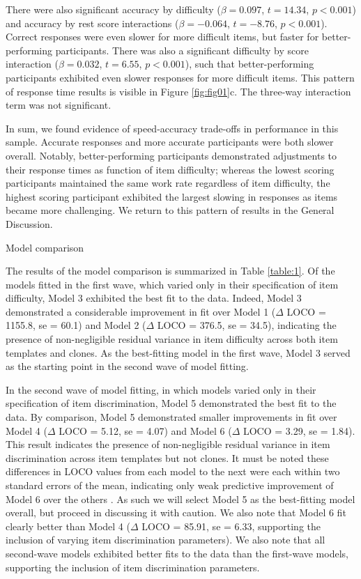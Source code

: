 \documentclass[a4paper,man,natbib]{apa6}
\makeatletter
\renewcommand{\subsubsection}{\@startsection{subsubsection}{3}
  {\z@}%
  {\b@level@two@skip}{\e@level@two@skip}%
  {\normalfont\normalsize\bfseries}}
\makeatother
\begin{document}
There were also significant accuracy by difficulty ($\beta = 0.097$, $t = 14.34$, $p < 0.001$) and accuracy by rest score interactions ($\beta = -0.064$, $t = -8.76$, $p < 0.001$). Correct responses were even slower for more difficult items, but faster for better-performing participants. There was also a significant difficulty by score interaction ($\beta = 0.032$, $t = 6.55$, $p < 0.001$), such that better-performing participants exhibited even slower responses for more difficult items. This pattern of response time results is visible in Figure \ref{fig:fig01}c. The three-way interaction term was not significant. 

In sum, we found evidence of speed-accuracy trade-offs in performance in this sample. Accurate responses and more accurate participants were both slower overall. Notably, better-performing participants demonstrated adjustments to their response times as function of item difficulty; whereas the lowest scoring participants maintained the same work rate regardless of item difficulty, the highest scoring participant exhibited the largest slowing in responses as items became more challenging. We return to this pattern of results in the General Discussion. 

\subsubsection{Model comparison}

The results of the model comparison is summarized in Table \ref{table:1}. Of the models fitted in the first wave, which varied only in their specification of item difficulty, Model 3 exhibited the best fit to the data. Indeed, Model 3 demonstrated a considerable improvement in fit over Model 1 ($\Delta$ LOCO = 1155.8, se = 60.1) and Model 2 ($\Delta$ LOCO = 376.5, se = 34.5), indicating the presence of non-negligible residual variance in item difficulty across both item templates and clones. As the best-fitting model in the first wave, Model 3 served as the starting point in the second wave of model fitting.

In the second wave of model fitting, in which models varied only in their specification of item discrimination, Model 5 demonstrated the best fit to the data. By comparison, Model 5 demonstrated smaller improvements in fit over Model 4 ($\Delta$ LOCO = 5.12, se = 4.07) and Model 6 ($\Delta$ LOCO = 3.29, se = 1.84). This result indicates the presence of non-negligible residual variance in item discrimination across item templates but not clones. It must be noted these differences in LOCO values from each model to the next were each within two standard errors of the mean, indicating only weak predictive improvement of Model 6 over the others \citep{vehtari2022cv}. As such we will select Model 5 as the best-fitting model overall, but proceed in discussing it with caution. We also note that Model 6 fit clearly better than Model 4 ($\Delta$ LOCO = 85.91, se = 6.33, supporting the inclusion of varying item discrimination parameters). We also note that all second-wave models exhibited better fits to the data than the first-wave models, supporting the inclusion of item discrimination parameters.
\end{document}
